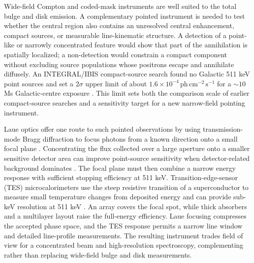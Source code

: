 \documentclass[11pt]{article}
\newcommand{\phcms}{\ensuremath{\,\mathrm{ph\,cm^{-2}\,s^{-1}}}}
\begin{document}
Wide-field Compton and coded-mask instruments are well suited to the total
bulge and disk emission. A complementary pointed instrument is needed to test
whether the central region also contains an unresolved central enhancement,
compact sources, or measurable line-kinematic structure. A detection of a
point-like or narrowly concentrated feature would show that part of the
annihilation is spatially localized; a non-detection would constrain a compact
component without excluding source populations whose positrons escape and
annihilate diffusely. An INTEGRAL/IBIS compact-source search found no Galactic
511 keV point sources and set a $2\sigma$ upper limit of about
$1.6\times10^{-4}\phcms$ for a $\sim10$ Ms Galactic-centre exposure
\cite{DeCesare2011}. This limit sets both the comparison scale of earlier
compact-source searches and a sensitivity target for a new narrow-field
pointing instrument.

Laue optics offer one route to such pointed observations by using
transmission-mode Bragg diffraction to focus photons from a known direction
onto a small focal plane \cite{Barriere2009Laue,Barriere2011LauePrototype}.
Concentrating the flux collected over a large aperture onto a smaller sensitive
detector area can improve point-source sensitivity when detector-related
background dominates \cite{Weidenspointner2006MAX}. The focal plane must then
combine a narrow energy response with sufficient stopping efficiency at
511 keV. Transition-edge-sensor (TES) microcalorimeters use the steep
resistive transition of a superconductor to measure small temperature changes
from deposited energy and can provide sub-keV resolution at 511 keV
\cite{Shirazi2023,Zhang2022TESGamma}. An array covers the focal spot, while thick absorbers and a
multilayer layout raise the full-energy efficiency. Laue focusing compresses
the accepted phase space, and the TES response permits a narrow line window and
detailed line-profile measurements. The resulting instrument trades field of
view for a concentrated beam and high-resolution spectroscopy, complementing
rather than replacing wide-field bulge and disk measurements.
\end{document}

